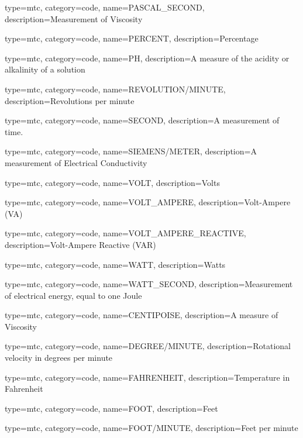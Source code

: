{
  type=mtc,
  category=code,
  name={PASCAL\_SECOND},
  description={Measurement of Viscosity}
}

{
  type=mtc,
  category=code,
  name={PERCENT},
  description={Percentage}
}

{
  type=mtc,
  category=code,
  name={PH},
  description={A measure of the acidity or alkalinity of a solution}
}

{
  type=mtc,
  category=code,
  name={REVOLUTION/MINUTE},
  description={Revolutions per minute}
}

{
  type=mtc,
  category=code,
  name={SECOND},
  description={A measurement of time.}
}

{
  type=mtc,
  category=code,
  name={SIEMENS/METER},
  description={A measurement of Electrical Conductivity}
}

{
  type=mtc,
  category=code,
  name={VOLT},
  description={Volts}
}

{
  type=mtc,
  category=code,
  name={VOLT\_AMPERE},
  description={Volt-Ampere  (VA)}
}

{
  type=mtc,
  category=code,
  name={VOLT\_AMPERE\_REACTIVE},
  description={Volt-Ampere Reactive  (VAR)}
}

{
  type=mtc,
  category=code,
  name={WATT},
  description={Watts}
}

{
  type=mtc,
  category=code,
  name={WATT\_SECOND},
  description={Measurement of electrical energy, equal to one Joule}
}



{
  type=mtc,
  category=code,
  name={CENTIPOISE},
  description={A measure of Viscosity}
}

{
  type=mtc,
  category=code,
  name={DEGREE/MINUTE},
  description={Rotational velocity in degrees per minute}
}

{
  type=mtc,
  category=code,
  name={FAHRENHEIT},
  description={Temperature in Fahrenheit}
}

{
  type=mtc,
  category=code,
  name={FOOT},
  description={Feet}
}

{
  type=mtc,
  category=code,
  name={FOOT/MINUTE},
  description={Feet per minute}
}

